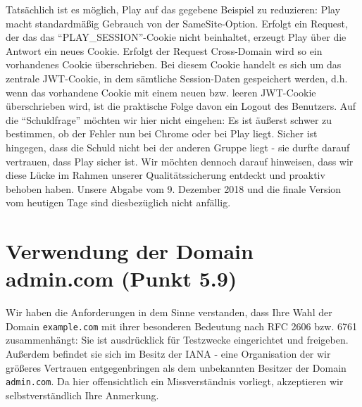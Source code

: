 \documentclass[12pt,DIV14,BCOR10mm,a4paper,parskip=half-,headsepline,headinclude,english,ngerman,bibliography=totocnumbered]{scrreprt}
\begin{document}
Tatsächlich ist es möglich, Play auf das gegebene Beispiel zu reduzieren: Play macht standardmäßig Gebrauch von der SameSite-Option. Erfolgt ein Request, der das das \enquote{PLAY\_SESSION}-Cookie nicht beinhaltet, erzeugt Play über die Antwort ein neues Cookie. Erfolgt der Request Cross-Domain wird so ein vorhandenes Cookie überschrieben. Bei diesem Cookie handelt es sich um das zentrale JWT-Cookie, in dem sämtliche Session-Daten gespeichert werden, d.h. wenn das vorhandene Cookie mit einem neuen bzw. leeren JWT-Cookie überschrieben wird, ist die praktische Folge davon ein Logout des Benutzers.\newline\newline
Auf die \enquote{Schuldfrage} möchten wir hier nicht eingehen: Es ist äußerst schwer zu bestimmen, ob der Fehler nun bei Chrome oder bei Play liegt. Sicher ist hingegen, dass die Schuld nicht bei der anderen Gruppe liegt - sie durfte darauf vertrauen, dass Play sicher ist. Wir möchten dennoch darauf hinweisen, dass wir diese Lücke im Rahmen unserer Qualitätssicherung entdeckt und proaktiv behoben haben. Unsere Abgabe vom 9. Dezember 2018 und die finale Version vom heutigen Tage sind diesbezüglich nicht anfällig.

\section{Verwendung der Domain admin.com (Punkt 5.9)}

Wir haben die Anforderungen in dem Sinne verstanden, dass Ihre Wahl der Domain \texttt{example.com} mit ihrer besonderen Bedeutung nach RFC 2606 bzw. 6761 zusammenhängt: Sie ist ausdrücklick für Testzwecke eingerichtet und freigeben. Außerdem befindet sie sich im Besitz der IANA - eine Organisation der wir größeres Vertrauen entgegenbringen als dem unbekannten Besitzer der Domain \texttt{admin.com}.
Da hier offensichtlich ein Missverständnis vorliegt, akzeptieren wir selbstverständlich Ihre Anmerkung.



\printbibliography

\printacronyms[title=Abkürzungsverzeichnis,toctitle=Abkürzungsverzeichnis]
\printglossary[title=Glossar,toctitle=Glossar,type=main]

\iftotalfigures
  \listoffigures
\fi

\end{document}
